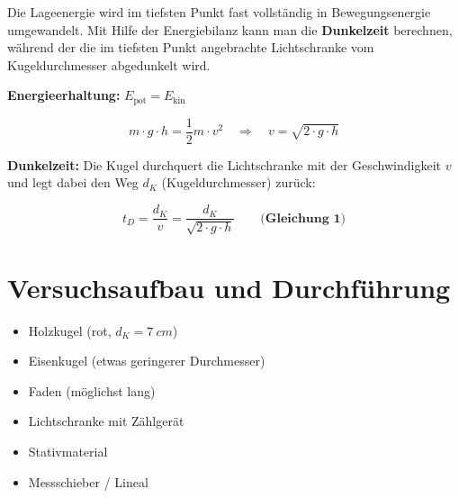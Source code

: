 \documentclass[11pt,a4paper]{scrartcl}
\begin{document}
	\vspace{0.3cm}
	
	Die Lageenergie wird im tiefsten Punkt fast vollständig in Bewegungsenergie umgewandelt. Mit Hilfe der Energiebilanz kann man die \textbf{Dunkelzeit} berechnen, während der die im tiefsten Punkt angebrachte Lichtschranke vom Kugeldurchmesser abgedunkelt wird.
	
	\begin{formelbox}[title={\faIcon{square-root-alt} Herleitung der Dunkelzeit}]
		\textbf{Energieerhaltung:} \quad $E_{\text{pot}} = E_{\text{kin}}$
		
		\vspace{0.2cm}
		\[m \cdot g \cdot h = \frac{1}{2} m \cdot v^2 \quad \Rightarrow \quad v = \sqrt{2 \cdot g \cdot h}\]
		
		\vspace{0.3cm}
		\textbf{Dunkelzeit:} Die Kugel durchquert die Lichtschranke mit der Geschwindigkeit $v$ und legt dabei den Weg $d_K$ (Kugeldurchmesser) zurück:
		
		\vspace{0.2cm}
		\[t_D = \frac{d_K}{v} = \frac{d_K}{\sqrt{2 \cdot g \cdot h}}\qquad\textbf{(Gleichung 1)}\] 
	\end{formelbox}
	
	
	\section*{Versuchsaufbau und Durchführung}
	
	\begin{materialbox}
		\begin{itemize}
			\item Holzkugel (rot, $d_K = \SI{7}{cm}$)
			\item Eisenkugel (etwas geringerer Durchmesser)
			\item Faden (möglichst lang)
			\item Lichtschranke mit Zählgerät
			\item Stativmaterial
			\item Messschieber / Lineal
		\end{itemize}
	\end{materialbox}
	
\end{document}
